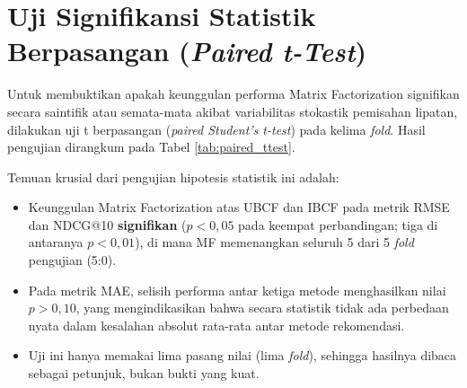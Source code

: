 \section{Uji Signifikansi Statistik Berpasangan (\textit{Paired t-Test})}
Untuk membuktikan apakah keunggulan performa Matrix Factorization signifikan secara saintifik atau semata-mata akibat variabilitas stokastik pemisahan lipatan, dilakukan uji t berpasangan (\textit{paired Student's t-test}) pada kelima \textit{fold}. Hasil pengujian dirangkum pada Tabel \ref{tab:paired_ttest}.

\begin{table}[htbp]
\centering
\caption[Hasil uji t berpasangan antar-algoritma 5-fold]{Hasil uji t berpasangan antar-algoritma pada 5-fold cross-validation}
\label{tab:paired_ttest}
\end{table}

Temuan krusial dari pengujian hipotesis statistik ini adalah:
\begin{itemize}
    \item Keunggulan Matrix Factorization atas UBCF dan IBCF pada metrik RMSE dan NDCG@10 \textbf{signifikan} ($p < 0,05$ pada keempat perbandingan; tiga di antaranya $p < 0,01$), di mana MF memenangkan seluruh 5 dari 5 \textit{fold} pengujian (5:0).
    \item Pada metrik MAE, selisih performa antar ketiga metode menghasilkan nilai $p > 0,10$, yang mengindikasikan bahwa secara statistik tidak ada perbedaan nyata dalam kesalahan absolut rata-rata antar metode rekomendasi.
    \item Uji ini hanya memakai lima pasang nilai (lima \textit{fold}), sehingga hasilnya dibaca sebagai petunjuk, bukan bukti yang kuat.
\end{itemize}

